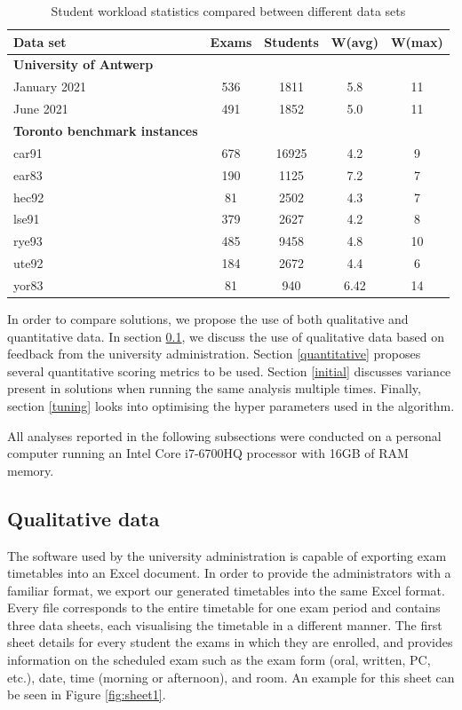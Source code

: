 \begin{table}[H]
	\caption{Student workload statistics compared between different data sets}
	\label{tab:workload_compared}
	\centering
	\begin{tabular}{l c c c c}
		\hline
		\textbf{Data set}& \textbf{Exams} & \textbf{Students} & \textbf{W(avg)} & \textbf{W(max)} \\ \hline
            \textbf{University of Antwerp} \\  \hline
		January 2021  & 536 & 1811 & 5.8 & 11 \\
		June 2021 & 491 & 1852 & 5.0 & 11 \\ \hline
              \textbf{Toronto benchmark instances} \\  \hline
		car91  & 678 & 16925 & 4.2 & 9 \\
		ear83 & 190 & 1125 & 7.2 & 7 \\
            hec92 & 81 & 2502 & 4.3 & 7 \\
            lse91 & 379 & 2627 & 4.2 & 8 \\
            rye93 & 485 & 9458 & 4.8 & 10 \\
            ute92 & 184 & 2672 & 4.4 & 6 \\
            yor83  & 81 & 940 & 6.42 & 14 \\ \hline
	\end{tabular}
\end{table}

In order to compare solutions, we propose the use of both qualitative and quantitative data. In section \ref{qualitative}, we discuss the use of qualitative data based on feedback from the university administration. Section \ref{quantitative} proposes several quantitative scoring metrics to be used. Section \ref{initial} discusses variance present in solutions when running the same analysis multiple times. Finally, section \ref{tuning} looks into optimising the hyper parameters used in the algorithm.

All analyses reported in the following subsections were conducted on a personal computer running an Intel Core i7-6700HQ processor with 16GB of RAM memory.

\subsection{Qualitative data} \label{qualitative}

The software used by the university administration is capable of exporting exam timetables into an Excel document. In order to provide the administrators with a familiar format, we export our generated timetables into the same Excel format. Every file corresponds to the entire timetable for one exam period and contains three data sheets, each visualising the timetable in a different manner. The first sheet details for every student the exams in which they are enrolled, and provides information on the scheduled exam such as the exam form (oral, written, PC, etc.), date, time (morning or afternoon), and room. An example for this sheet can be seen in Figure \ref{fig:sheet1}. 

